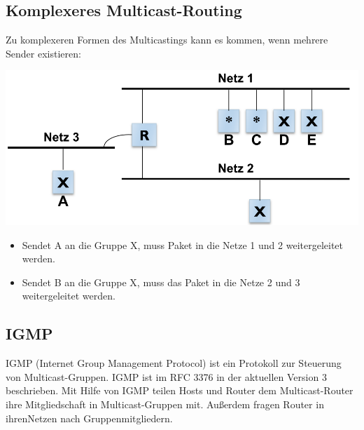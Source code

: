 \documentclass{article} %
\begin{document}
\subsection{Komplexeres Multicast-Routing}
Zu komplexeren Formen des Multicastings kann es kommen, wenn mehrere Sender existieren:
	\begin{center}
		\includegraphics[width=17cm]{img/komplMultiCast.png}
	\end{center}
	\begin{itemize}
	\item Sendet A an die Gruppe X, muss Paket in die Netze 1 und 2 weitergeleitet werden. 
	\item Sendet B an die Gruppe X, muss das Paket in die Netze 2 und 3 weitergeleitet werden. 
	\end{itemize}

\subsection{IGMP}
IGMP (Internet Group Management Protocol) ist ein Protokoll zur Steuerung von Multicast-Gruppen. IGMP ist im RFC 3376\cite{rfc3376} in der aktuellen Version 3 beschrieben. Mit Hilfe von IGMP teilen Hosts und Router dem Multicast-Router ihre Mitgliedschaft in Multicast-Gruppen mit. Außerdem fragen Router in \glqq ihren\grqq Netzen nach Gruppenmitgliedern.
\end{document}
